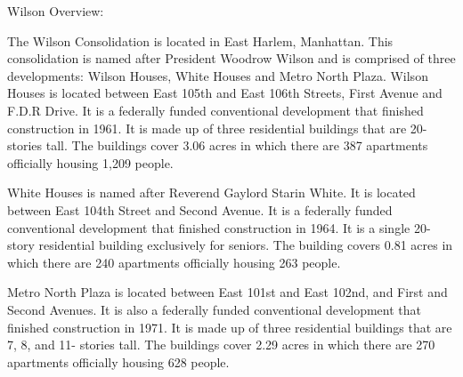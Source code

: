 Wilson Overview:     

   

The Wilson Consolidation is located in East Harlem, Manhattan. This consolidation is named after President Woodrow Wilson and is comprised of three developments: Wilson Houses, White Houses and Metro North Plaza. Wilson Houses is located between East 105th and East 106th Streets, First Avenue and F.D.R Drive. It is a federally funded conventional development that finished construction in 1961. It is made up of three residential buildings that are 20- stories tall. The buildings cover 3.06 acres in which there are 387 apartments officially housing 1,209 people. 

White Houses is named after Reverend Gaylord Starin White. It is located between East 104th Street and Second Avenue. It is a federally funded conventional development that finished construction in 1964. It is a single 20- story residential building exclusively for seniors. The building covers 0.81 acres in which there are 240 apartments officially housing 263 people. 

Metro North Plaza is located between East 101st and East 102nd, and First and Second Avenues. It is also a federally funded conventional development that finished construction in 1971. It is made up of three residential buildings that are 7, 8, and 11- stories tall. The buildings cover 2.29 acres in which there are 270  apartments officially housing 628  people.